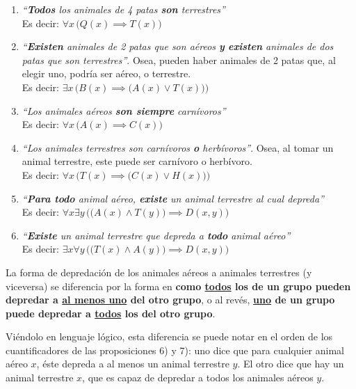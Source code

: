 \documentclass[legalpaper,10pt]{article}
\begin{document}
\begin{enumerate}[a)]
\begin{enumerate}[1)]
  \item \textit{``\textbf{Todos} los animales de 4 patas \textbf{son} terrestres''} \\ Es decir: \(\boxed{\forall x \, \big(Q(x) \implies T(x)\big)}\)

  \item \textit{``\textbf{Existen} animales de 2 patas que son aéreos \textbf{y} \textbf{existen} animales de dos patas que son terrestres''}. Osea, pueden haber animales de 2 patas que, al elegir uno, podría ser aéreo, o terrestre. \\ Es decir: \(\boxed{\exists x \, \Big( B(x) \implies \big( A(x) \lor T(x) \big) \Big)}\)

  \item \textit{``Los animales aéreos \textbf{son siempre} carnívoros''} \\ Es decir: \(\boxed{\forall x \, \big(A(x) \implies C(x)\big)}\)

  \item \textit{``Los animales terrestres son carnívoros \textbf{o} herbívoros''}. Osea, al tomar un animal terrestre, este puede ser carnívoro o herbívoro. \\ Es decir: \(\boxed{\forall x \, \Big( T(x) \implies \big(C(x) \lor H(x)\big) \Big)}\)

  \item \textit{``\textbf{Para todo} animal aéreo, \textbf{existe} un animal terrestre al cual depreda''} \\ Es decir: \(\boxed{\forall x \exists y \, \Big( \big(A(x) \land T(y)\big) \implies D(x, y) \Big)}\)

  \item \textit{``\textbf{Existe} un animal terrestre que depreda a \textbf{todo} animal aéreo''} \\ Es decir: \(\boxed{\exists x \forall y \, \Big( \big(T(x) \land A(y)\big) \implies D(x, y) \Big)}\)
\end{enumerate}

La forma de depredación de los animales aéreos a animales terrestres (y viceversa) se diferencia por la forma en \textbf{como \underline{todos} los de un grupo pueden depredar a \underline{al menos uno} del otro grupo}, o al revés, \textbf{\underline{uno} de un grupo puede depredar a \underline{todos} los del otro grupo}.

Viéndolo en lenguaje lógico, esta diferencia se puede notar en el orden de los cuantificadores de las proposiciones 6) y 7): uno dice que para cualquier animal aéreo \(x\), éste depreda a al menos un animal terrestre \(y\). El otro dice que hay un animal terrestre \(x\), que es capaz de depredar a todos los animales aéreos \(y\).

\end{enumerate}

\end{document}
